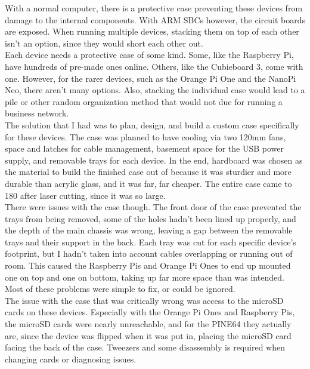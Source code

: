 \documentclass[12pt]{spieman}  %
\begin{document}
With a normal computer, there is a protective case preventing these devices from damage to the internal components. With ARM SBCs however, the circuit boards are exposed. When running multiple devices, stacking them on top of each other isn’t an option, since they would short each other out.\\

Each device needs a protective case of some kind. Some, like the Raspberry Pi, have hundreds of pre-made ones online. Others, like the Cubieboard 3, come with one. However, for the rarer devices, such as the Orange Pi One and the NanoPi Neo, there aren’t many options. Also, stacking the individual case would lead to a pile or other random organization method that would not due for running a business network.\\

The solution that I had was to plan, design, and build a custom case specifically for these devices. The case was planned to have cooling via two 120mm fans, space and latches for cable management, basement space for the USB power supply, and removable trays for each device. In the end, hardboard was chosen as the material to build the finished case out of because it was sturdier and more durable than acrylic glass, and it was far, far cheaper. The entire case came to 180 after laser cutting, since it was so large.\\

There were issues with the case though. The front door of the case prevented the trays from being removed, some of the holes hadn’t been lined up properly, and the depth of the main chassis was wrong, leaving a gap between the removable trays and their support in the back. Each tray was cut for each specific device’s footprint, but I hadn’t taken into account cables overlapping or running out of room. This caused the Raspberry Pis and Orange Pi Ones to end up mounted one on top and one on bottom, taking up far more space than was intended. Most of these problems were simple to fix, or could be ignored.\\

The issue with the case that was critically wrong was access to the microSD cards on these devices. Especially with the Orange Pi Ones and Raspberry Pis, the microSD cards were nearly unreachable, and for the PINE64 they actually are, since the device was flipped when it was put in, placing the microSD card facing the back of the case. Tweezers and some disassembly is required when changing cards or diagnosing issues.\\
\end{document}
